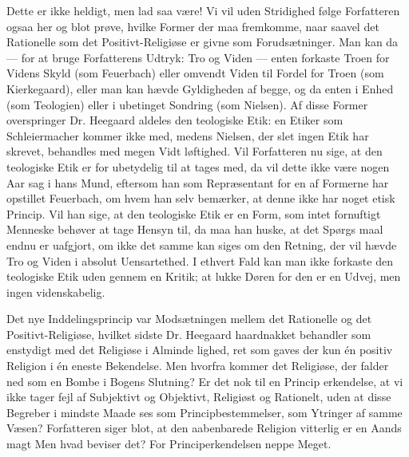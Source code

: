 \documentclass[12pt,a4paper,openany]{book}
\newcommand{\opage}[1]{\marginnote{\footnotesize\textit{[#1]}}}
\begin{document}
Dette er ikke heldigt, men lad saa være! Vi vil uden
Stridighed følge Forfatteren ogsaa her og blot prøve, hvilke
Former der maa fremkomme, naar saavel det Rationelle som
det Positivt-Religiøse er givne som Forudsætninger. Man kan
da --- for at bruge Forfatterens Udtryk: Tro og Viden ---
enten forkaste Troen for Videns Skyld (som Feuerbach) eller
omvendt Viden til Fordel for Troen (som Kierkegaard), eller
man kan hævde Gyldigheden af begge, og da enten i Enhed
(som Teologien) eller i ubetinget Sondring (som Nielsen). Af disse
Former overspringer Dr. Heegaard aldeles den teologiske Etik:
en Etiker som Schleiermacher kommer ikke med, medens Nielsen,
der slet ingen Etik har skrevet, behandles med megen Vidt\-%
løftighed. Vil Forfatteren nu sige, at den teologiske Etik er for
\opage{30}ubetydelig til at tages med, da vil dette ikke være nogen Aar\-%
sag i hans Mund, eftersom han som Repræsentant for en af
Formerne har opstillet Feuerbach, om hvem han selv bemærker,
at denne ikke har noget etisk Princip. Vil han sige, at den
teologiske Etik er en Form, som intet fornuftigt Menneske
behøver at tage Hensyn til, da maa han huske, at det Spørgs\-%
maal endnu er uafgjort, om ikke det samme kan siges om den
Retning, der vil hævde Tro og Viden i absolut Uensartethed.
I ethvert Fald kan man ikke forkaste den teologiske Etik uden
gennem en Kritik; at lukke Døren for den er en Udvej, men
ingen videnskabelig.

Det nye Inddelingsprincip var Modsætningen mellem det
Rationelle og det Positivt-Religiøse, hvilket sidste Dr. Heegaard
haardnakket behandler som enstydigt med det Religiøse i Alminde\-%
lighed, ret som gaves der kun én positiv Religion i én eneste
Bekendelse. Men hvorfra kommer det Religiøse, der falder ned
som en Bombe i Bogens Slutning? Er det nok til en Princip\-%
erkendelse, at vi ikke tager fejl af Subjektivt og Objektivt, Religiøst
og Rationelt, uden at disse Begreber i mindste Maade ses som
Principbestemmelser, som Ytringer af samme Væsen? Forfatteren
siger blot, at den aabenbarede Religion vitterlig er en Aands\-%
magt Men hvad beviser det? For Principerkendelsen neppe
Meget.
\end{document}
